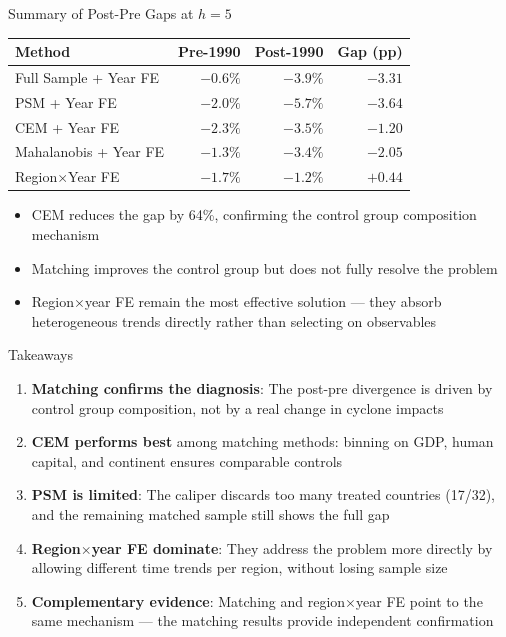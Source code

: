 \documentclass[aspectratio=169,c]{beamer}
\begin{document}
\begin{frame}{Summary of Post-Pre Gaps at $h = 5$}
\centering
\begin{tabular}{l r r r}
\hline
\textbf{Method} & \textbf{Pre-1990} & \textbf{Post-1990} & \textbf{Gap (pp)} \\
\hline
Full Sample + Year FE       & $-0.6\%$  & $-3.9\%$  & $-3.31$ \\
PSM + Year FE               & $-2.0\%$  & $-5.7\%$  & $-3.64$ \\
CEM + Year FE               & $-2.3\%$  & $-3.5\%$  & $-1.20$ \\
Mahalanobis + Year FE       & $-1.3\%$  & $-3.4\%$  & $-2.05$ \\
Region$\times$Year FE       & $-1.7\%$  & $-1.2\%$  & $+0.44$ \\
\hline
\end{tabular}

\bigskip
\begin{itemize}
  \item CEM reduces the gap by 64\%, confirming the control group composition mechanism
  \item Matching improves the control group but does not fully resolve the problem
  \item Region$\times$year FE remain the most effective solution --- they absorb heterogeneous trends directly rather than selecting on observables
\end{itemize}
\end{frame}

\begin{frame}{Takeaways}
\begin{enumerate}
  \item \textbf{Matching confirms the diagnosis}: The post-pre divergence is driven by control group composition, not by a real change in cyclone impacts
  \medskip
  \item \textbf{CEM performs best} among matching methods: binning on GDP, human capital, and continent ensures comparable controls
  \medskip
  \item \textbf{PSM is limited}: The caliper discards too many treated countries (17/32), and the remaining matched sample still shows the full gap
  \medskip
  \item \textbf{Region$\times$year FE dominate}: They address the problem more directly by allowing different time trends per region, without losing sample size
  \medskip
  \item \textbf{Complementary evidence}: Matching and region$\times$year FE point to the same mechanism --- the matching results provide independent confirmation
\end{enumerate}
\end{frame}
\end{document}
